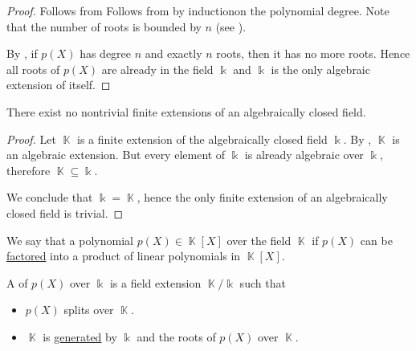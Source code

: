 \begin{proof}
   Follows from  Follows from  by induction\IND on the polynomial degree. Note that the number of roots is bounded by \( n \) (see ).

   By , if \( p(X) \) has degree \( n \) and exactly \( n \) roots, then it has no more roots. Hence all roots of \( p(X) \) are already in the field \( \Bbbk \) and \( \Bbbk \) is the only algebraic extension of itself.
\end{proof}

\begin{proposition}\label{thm:no_finite_extensions_of_closed_fields}
  There exist no nontrivial finite extensions of an algebraically closed field.
\end{proposition}
\begin{proof}
  Let \( \BbbK \) is a finite extension of the algebraically closed field \( \Bbbk \). By , \( \BbbK \) is an algebraic extension. But every element of \( \Bbbk \) is already algebraic over \( \Bbbk \), therefore \( \BbbK \subseteq \Bbbk \).

  We conclude that \( \Bbbk = \BbbK \), hence the only finite extension of an algebraically closed field is trivial.
\end{proof}

\begin{definition}\label{def:splitting_field}\mcite\cite[458]{Knapp2016BAlg}
  We say that a polynomial \( p(X) \in \BbbK[X] \) over the field \( \BbbK \)  if \( p(X) \) can be \hyperref[def:factorization_in_ring]{factored} into a product of linear polynomials in \( \BbbK[X] \).

  A  of \( p(X) \) over \( \Bbbk \) is a field extension \( \BbbK / \Bbbk \) such that
  \begin{itemize}
    \item \( p(X) \) splits over \( \BbbK \).
    \item \( \BbbK \) is \hyperref[def:generated_ring_ideal]{generated} by \( \Bbbk \) and the roots of \( p(X) \) over \( \BbbK \).
  \end{itemize}
\end{definition}

